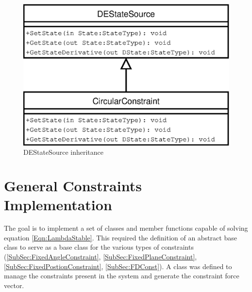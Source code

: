 \begin{figure}
    \centering
    \includegraphics[height=0.3\textheight]{DEStateSourceDia}    
    \caption{\label{Fig:DEStateSourceDia}DEStateSource inheritance}
\end{figure}
 
\section{General Constraints Implementation}
The goal is to implement a set of classes and member functions capable of
solving equation \ref{Eqn:LambdaStable}. This required the definition of an
abstract base class  to serve as a base class for the
various types of constraints (\ref{SubSec:FixedAngleConstraint},
\ref{SubSec:FixedPlaneConstraint}, \ref{SubSec:FixedPostionConstraint},
\ref{SubSec:FDConst}). A class  was defined to
manage the constraints present in the system and generate the constraint force
vector. 

